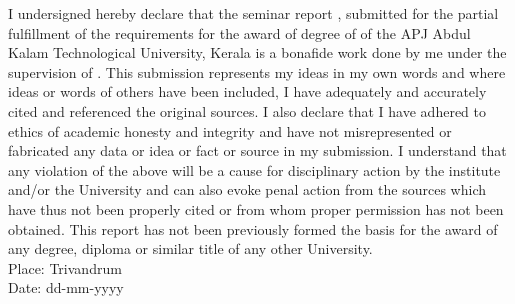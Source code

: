 
I undersigned hereby declare that the seminar report \projectname{} 
, submitted for the partial fulfillment of the requirements for the award of degree of \degree{} of the APJ Abdul Kalam Technological University, Kerala is a bonafide work done by me under the supervision of \guide{}. This submission represents my ideas in my own words and where ideas or words of others have been included, I have adequately and accurately cited and referenced the original sources. I also declare that I have adhered to ethics of academic honesty and integrity and have not misrepresented or fabricated any data or idea or fact or source in my submission. I understand that any violation of the above will be a cause for disciplinary action by the institute and/or the University and can also evoke penal action from the sources which have thus not been properly cited or from whom proper permission has not been obtained. This report has not been previously formed the basis for the award of any degree, diploma or similar title of any other University. 
\vspace{20mm}
\\Place: Trivandrum								
\\Date: dd-mm-yyyy     \hfill     \stud{} 
